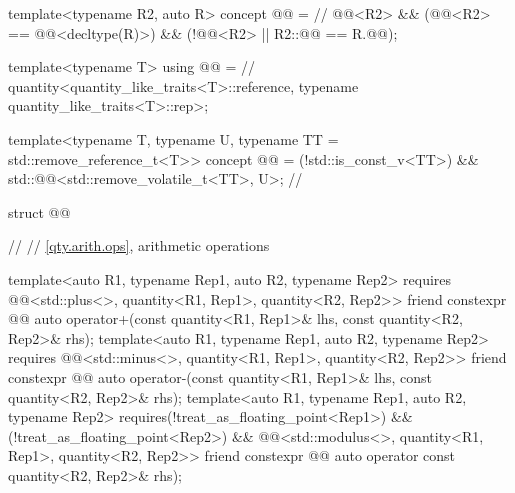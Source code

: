 \begin{codeblock}
{template<typename R2, auto R>
concept @@ =                                                // \expos
  @@<R2> &&
  (@@<R2> == @@<decltype(R)>) &&
  (!@@<R2> || R2::@@ == R.@@);

template<typename T>
using @@ =                                                 // \expos
  quantity<quantity_like_traits<T>::reference, typename quantity_like_traits<T>::rep>;

template<typename T, typename U, typename TT = std::remove_reference_t<T>>
concept @@ = (!std::is_const_v<TT>) && std::@@<std::remove_volatile_t<TT>, U>; // \expos

struct @@ {  // \expos
  // \ref{qty.arith.ops}, arithmetic operations

  template<auto R1, typename Rep1, auto R2, typename Rep2>
    requires @@<std::plus<>, quantity<R1, Rep1>, quantity<R2, Rep2>>
  friend constexpr @@ auto operator+(const quantity<R1, Rep1>& lhs,
                                                 const quantity<R2, Rep2>& rhs);
  template<auto R1, typename Rep1, auto R2, typename Rep2>
    requires @@<std::minus<>, quantity<R1, Rep1>, quantity<R2, Rep2>>
  friend constexpr @@ auto operator-(const quantity<R1, Rep1>& lhs,
                                                 const quantity<R2, Rep2>& rhs);
  template<auto R1, typename Rep1, auto R2, typename Rep2>
    requires(!treat_as_floating_point<Rep1>) && (!treat_as_floating_point<Rep2>) &&
            @@<std::modulus<>, quantity<R1, Rep1>, quantity<R2, Rep2>>
  friend constexpr @@ auto operator%
                                                 const quantity<R2, Rep2>& rhs);

}}
\end{codeblock}
